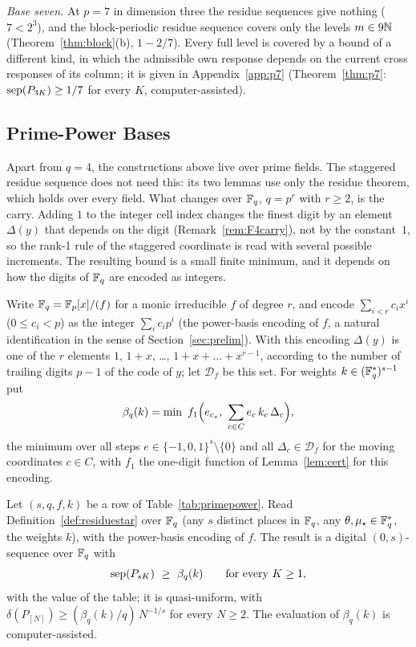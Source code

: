 \emph{Base seven.} At $p=7$ in dimension three the residue sequences give nothing ($7<2^3$), and the block-periodic residue sequence covers only the levels $m\in9\mathbb{N}$ (Theorem~\ref{thm:block}(b), $1-2/7$). Every full level is covered by a bound of a different kind, in which the admissible own response depends on the current cross responses of its column; it is given in Appendix~\ref{app:p7} (Theorem~\ref{thm:p7}: $\operatorname{sep}(P_{3K})\ge1/7$ for every $K$, computer-assisted).

\subsection{Prime-Power Bases}\label{sec:primepower}
Apart from $q=4$, the constructions above live over prime fields. The staggered residue sequence does not need this: its two lemmas use only the residue theorem, which holds over every field. What changes over $\mathbb{F}_q$, $q=p^r$ with $r\ge2$, is the carry. Adding $1$ to the integer cell index changes the finest digit by an element $\Delta(y)$ that depends on the digit (Remark~\ref{rem:F4carry}), not by the constant~$1$, so the rank-1 rule of the staggered coordinate is read with several possible increments. The resulting bound is a small finite minimum, and it depends on how the digits of $\mathbb{F}_q$ are encoded as integers.

Write $\mathbb{F}_q=\mathbb{F}_p[x]/(f)$ for a monic irreducible $f$ of degree $r$, and encode $\sum_{i<r}c_ix^i$ ($0\le c_i<p$) as the integer $\sum_ic_ip^i$ (the power-basis encoding of $f$, a natural identification in the sense of Section~\ref{sec:prelim}). With this encoding $\Delta(y)$ is one of the $r$ elements $1$, $1+x$, \dots, $1+x+\dots+x^{r-1}$, according to the number of trailing digits $p-1$ of the code of $y$; let $\mathcal D_f$ be this set. For weights $k\in(\mathbb{F}_q^*)^{s-1}$ put
\[
\beta_q(k)=\min\ f_1\Bigl(e_{c_{\star}},\ \sum_{c\in C}e_c\,k_c\,\Delta_c\Bigr),
\]
the minimum over all steps $e\in\{-1,0,1\}^s\setminus\{0\}$ and all $\Delta_c\in\mathcal D_f$ for the moving coordinates $c\in C$, with $f_1$ the one-digit function of Lemma~\ref{lem:cert} for this encoding.

\begin{proposition}\label{prop:primepower}
Let $(s,q,f,k)$ be a row of Table~\ref{tab:primepower}. Read Definition~\ref{def:residuestar} over $\mathbb{F}_q$ (any $s$ distinct places in $\mathbb{F}_q$, any $\theta,\mu_\star\in\mathbb{F}_q^*$, the weights $k$), with the power-basis encoding of $f$. The result is a digital $(0,s)$-sequence over $\mathbb{F}_q$ with
\[
\operatorname{sep}(P_{sK})\ \ge\ \beta_q(k)\qquad\text{for every }K\ge1,
\]
with the value of the table; it is quasi-uniform, with $\delta(P_{[N]})\ge(\beta_q(k)/q)\,N^{-1/s}$ for every $N\ge2$. The evaluation of $\beta_q(k)$ is computer-assisted.
\end{proposition}

